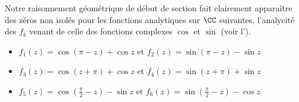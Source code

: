 
\begin{example}
    Notre raisonnement géométrique de début de section fait clairement apparaître des zéros non isolés pour les fonctions analytiques sur $\CC$ suivantes, l'analycité des $f_k$ venant de celle des fonctions complexes $\cos$ et $\sin$ (voir l').
    \begin{itemize}[label=\small\textbullet]
    	\item $f_1(z) = \cos (\pi - z) + \cos z$ 
    	   et $f_2(z) = \sin (\pi - z) - \sin z$ 
    
    	\smallskip
    	\item $f_3(z) =\cos (z + \pi) + \cos z$ 
    	   et $f_4(z) =\sin (z + \pi) + \sin z$
    
    	\smallskip
    	\item $f_5(z) =\cos \left( \frac{\pi}{2} - z \right) - \sin z$ 
    	   et $f_6(z) =\sin \left( \frac{\pi}{2} - z \right) - \cos z$ 
    \end{itemize}
\end{example}
